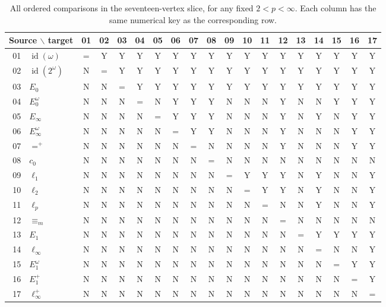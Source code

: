 \documentclass[11pt]{article}
\numberwithin{equation}{section}
\theoremstyle{definition}
\begin{document}
\begin{table}[htbp]
\centering
\small
\setlength{\tabcolsep}{3.3pt}
\renewcommand{\arraystretch}{1.13}
\begin{tabular}{r@{\quad}l*{17}{c}}
\toprule
\multicolumn{2}{c}{Source $\backslash$ target} & 01 & 02 & 03 & 04 & 05 & 06 & 07 & 08 & 09 & 10 & 11 & 12 & 13 & 14 & 15 & 16 & 17\\
\midrule
01 & $\operatorname{id}(\omega)$ & = & Y & Y & Y & Y & Y & Y & Y & Y & Y & Y & Y & Y & Y & Y & Y & Y\\
02 & $\operatorname{id}(2^\omega)$ & N & = & Y & Y & Y & Y & Y & Y & Y & Y & Y & Y & Y & Y & Y & Y & Y\\
03 & $E_0$ & N & N & = & Y & Y & Y & Y & Y & Y & Y & Y & Y & Y & Y & Y & Y & Y\\
04 & $E_0^\omega$ & N & N & N & = & N & Y & Y & Y & N & N & N & Y & N & N & Y & Y & Y\\
05 & $E_\infty$ & N & N & N & N & = & Y & Y & Y & N & N & N & Y & N & Y & N & Y & Y\\
06 & $E_\infty^\omega$ & N & N & N & N & N & = & Y & Y & N & N & N & Y & N & N & N & Y & Y\\
07 & $=^+$ & N & N & N & N & N & N & = & N & N & N & N & Y & N & N & N & Y & Y\\
08 & $c_0$ & N & N & N & N & N & N & N & = & N & N & N & N & N & N & N & N & N\\
09 & $\ell_1$ & N & N & N & N & N & N & N & N & = & Y & Y & Y & N & Y & N & N & Y\\
10 & $\ell_2$ & N & N & N & N & N & N & N & N & N & = & Y & Y & N & Y & N & N & Y\\
11 & $\ell_p$ & N & N & N & N & N & N & N & N & N & N & = & N & N & Y & N & N & Y\\
12 & $\equiv_m$ & N & N & N & N & N & N & N & N & N & N & N & = & N & N & N & N & N\\
13 & $E_1$ & N & N & N & N & N & N & N & N & N & N & N & N & = & Y & Y & Y & Y\\
14 & $\ell_\infty$ & N & N & N & N & N & N & N & N & N & N & N & N & N & = & N & N & Y\\
15 & $E_1^\omega$ & N & N & N & N & N & N & N & N & N & N & N & N & N & N & = & Y & Y\\
16 & $E_1^+$ & N & N & N & N & N & N & N & N & N & N & N & N & N & N & N & = & Y\\
17 & $\ell_\infty^+$ & N & N & N & N & N & N & N & N & N & N & N & N & N & N & N & N & =\\
\bottomrule
\end{tabular}
\caption{All ordered comparisons in the seventeen-vertex slice, for any fixed $2<p<\infty$. Each column has the same numerical key as the corresponding row.}
\label{tab:matrix}
\end{table}
\end{document}
